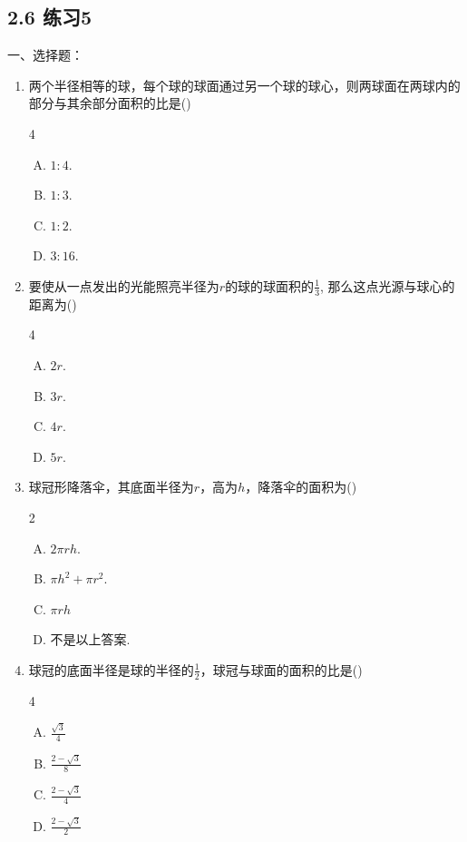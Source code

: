 \subsection*{2.6  练习5}
一、选择题：
\begin{enumerate}
    \item 两个半径相等的球，每个球的球面通过另一个球的球心，则两球面在两球内的部分与其余部分面积的比是\hfill (\qquad )
\begin{multicols}{4}
\begin{enumerate}[(A)]
\item $ 1:4$.
    \item $1:3$.
    \item $1:2$.
    \item $3:16$.
\end{enumerate}    
\end{multicols}

\item 要使从一点发出的光能照亮半径为$r$的球的球面积的$\frac{1}{3}$, 那么这点光源与球心的距离为\hfill (\qquad )
\begin{multicols}{4}
    \begin{enumerate}[(A)]
\item $2r$.
\item $3r$.
\item $4r$.
\item $5r$.
    \end{enumerate}    
    \end{multicols}

\item 球冠形降落伞，其底面半径为$r$，高为$h$，降落伞的面积为\hfill (\qquad )
\begin{multicols}{2}
\begin{enumerate}[(A)]
\item $2\pi rh$.
\item $\pi h^2+\pi r^2$.
\item $\pi rh$
\item 不是以上答案.
\end{enumerate}    
\end{multicols}

\item 球冠的底面半径是球的半径的$\frac{1}{2}$，球冠与球面的面积的比是\hfill (\qquad )
\begin{multicols}{4}
\begin{enumerate}[(A)]
    \item $\frac{\sqrt{3}}{4}$
    \item $\frac{2-\sqrt{3}}{8}$
    \item $\frac{2-\sqrt{3}}{4}$
    \item $\frac{2-\sqrt{3}}{2}$
\end{enumerate}    
\end{multicols}


\end{enumerate}
